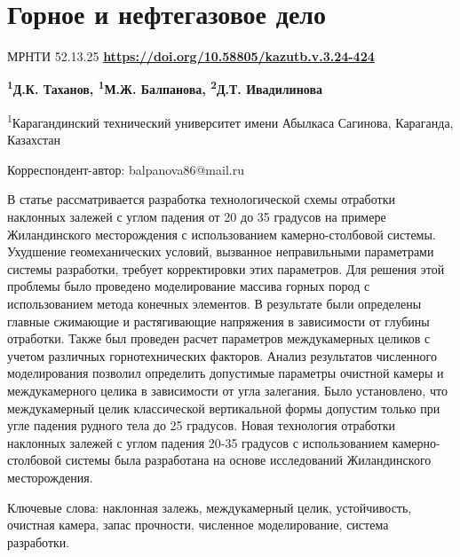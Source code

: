 \newpage
\let\cleardoublepage\clearpage
\chapter{Горное и нефтегазовое дело}
МРНТИ 52.13.25
\hfill {\bfseries \href{https://doi.org/10.58805/kazutb.v.3.24-424}{https://doi.org/10.58805/kazutb.v.3.24-424}}


\begin{center}
{\bfseries \textsuperscript{1}Д.К. Таханов, \textsuperscript{1}М.Ж.
Балпанова\envelope, \textsuperscript{2}Д.Т. Ивадилинова}

\textsuperscript{1}Карагандинский технический университет имени Абылкаса
Сагинова, Караганда, Казахстан
\end{center}
\envelope Корреспондент-автор: balpanova86@mail.ru


В статье рассматривается разработка технологической схемы отработки
наклонных залежей с углом падения от 20 до 35 градусов на примере
Жиландинского месторождения с использованием камерно-столбовой системы.
Ухудшение геомеханических условий, вызванное неправильными параметрами
системы разработки, требует корректировки этих параметров. Для решения
этой проблемы было проведено моделирование массива горных пород с
использованием метода конечных элементов. В результате были определены
главные сжимающие и растягивающие напряжения в зависимости от глубины
отработки. Также был проведен расчет параметров междукамерных целиков с
учетом различных горнотехнических факторов. Анализ результатов
численного моделирования позволил определить допустимые параметры
очистной камеры и междукамерного целика в зависимости от угла залегания.
Было установлено, что междукамерный целик классической вертикальной
формы допустим только при угле падения рудного тела до 25 градусов.
Новая технология отработки наклонных залежей с углом падения 20-35
градусов с использованием камерно-столбовой системы была разработана на
основе исследований Жиландинского месторождения.

Ключевые слова: наклонная залежь, междукамерный целик, устойчивость,
очистная камера, запас прочности, численное моделирование, система
разработки.


